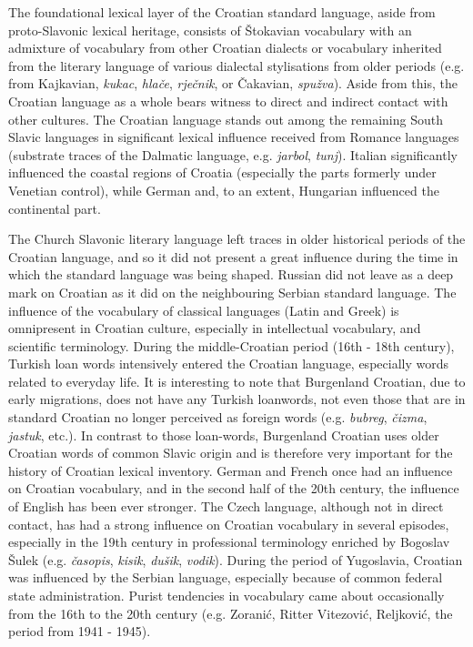 \begin{multicols}{2}
The foundational lexical layer of the Croatian standard language, aside from proto-Slavonic lexical heritage, consists of Štokavian vocabulary with an admixture of vocabulary from other Croatian dialects or vocabulary inherited from the literary language of various dialectal stylisations from older periods (e.g. from Kajkavian, \emph{kukac}, \emph{hlače}, \emph{rječnik}, or Čakavian, \emph{spužva}). Aside from this, the Croatian language as a whole bears witness to direct and indirect contact with other cultures. The Croatian language stands out among the remaining South Slavic languages in significant lexical influence received from Romance languages (substrate traces of the Dalmatic language, e.g. \emph{jarbol}, \emph{tunj}).  Italian significantly influenced the coastal regions of Croatia (especially the parts formerly under Venetian control), while German and, to an extent, Hungarian influenced the continental part. 

The Church Slavonic literary language left traces in older historical periods of the Croatian language, and so it did not present a great influence during the time in which the standard language was being shaped. Russian did not leave as a deep mark on Croatian as it did on the neighbouring Serbian standard language. The influence of the vocabulary of classical languages (Latin and Greek) is omnipresent in Croatian culture, especially in intellectual vocabulary, and scientific terminology. During the middle-Croatian period (16th - 18th century), Turkish loan words intensively entered the Croatian language, especially words related to everyday life. It is interesting to note that Burgenland Croatian, due to early migrations, does not have any Turkish loanwords, not even those that are in standard Croatian no longer perceived as foreign words (e.g. \emph{bubreg}, \emph{čizma}, \emph{jastuk}, etc.). In contrast to those loan-words, Burgenland Croatian uses older Croatian words of common Slavic origin and is therefore very important for the history of Croatian lexical inventory. German and French once had an influence on Croatian vocabulary, and in the second half of the 20th century, the influence of English has been ever stronger. The Czech language, although not in direct contact, has had a strong influence on Croatian vocabulary in several episodes, especially in the 19th century in professional terminology enriched by Bogoslav Šulek (e.g. \emph{časopis}, \emph{kisik}, \emph{dušik}, \emph{vodik}). During the period of Yugoslavia, Croatian was influenced by the Serbian language, especially because of common federal state administration. Purist tendencies in vocabulary came about occasionally from the 16th to the 20th century (e.g. Zoranić, Ritter Vitezović, Reljković, the period from 1941 - 1945).


\end{multicols}
